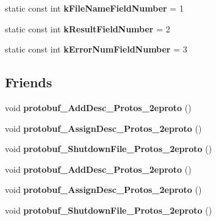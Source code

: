 \begin{DoxyCompactItemize}
\item 
\mbox{\label{classruntime_1_1FileSendComplete_a9d5111b1c3f9c97345b37d1df117b794}} 
static const int {\bfseries k\+File\+Name\+Field\+Number} = 1
\item 
\mbox{\label{classruntime_1_1FileSendComplete_a45f464a4e24df0c87128557a50bd85e8}} 
static const int {\bfseries k\+Result\+Field\+Number} = 2
\item 
\mbox{\label{classruntime_1_1FileSendComplete_a0ac15a8e75e996274a983d23024edb16}} 
static const int {\bfseries k\+Error\+Num\+Field\+Number} = 3
\end{DoxyCompactItemize}
\subsection*{Friends}
\begin{DoxyCompactItemize}
\item 
\mbox{\label{classruntime_1_1FileSendComplete_ae10616842f51ae52b59c40d2393fc939}} 
void {\bfseries protobuf\+\_\+\+Add\+Desc\+\_\+\+Protos\+\_\+2eproto} ()
\item 
\mbox{\label{classruntime_1_1FileSendComplete_adb7ebfa843677cabd6e050c0a818aaa8}} 
void {\bfseries protobuf\+\_\+\+Assign\+Desc\+\_\+\+Protos\+\_\+2eproto} ()
\item 
\mbox{\label{classruntime_1_1FileSendComplete_a52fc8399a5f56aa162db2eb9f615dd97}} 
void {\bfseries protobuf\+\_\+\+Shutdown\+File\+\_\+\+Protos\+\_\+2eproto} ()
\item 
\mbox{\label{classruntime_1_1FileSendComplete_ae10616842f51ae52b59c40d2393fc939}} 
void {\bfseries protobuf\+\_\+\+Add\+Desc\+\_\+\+Protos\+\_\+2eproto} ()
\item 
\mbox{\label{classruntime_1_1FileSendComplete_adb7ebfa843677cabd6e050c0a818aaa8}} 
void {\bfseries protobuf\+\_\+\+Assign\+Desc\+\_\+\+Protos\+\_\+2eproto} ()
\item 
\mbox{\label{classruntime_1_1FileSendComplete_a52fc8399a5f56aa162db2eb9f615dd97}} 
void {\bfseries protobuf\+\_\+\+Shutdown\+File\+\_\+\+Protos\+\_\+2eproto} ()
\end{DoxyCompactItemize}


